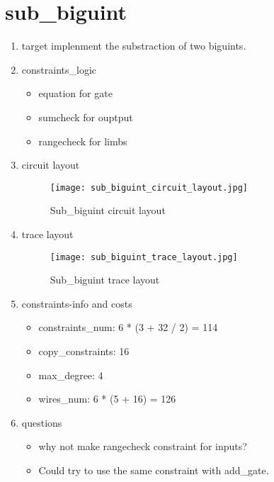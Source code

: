 \section{sub_biguint}
\label{sub_biguint}

\begin{enumerate}
    \item target
        implenment the substraction of two biguints.
    \item constraints_logic
        \begin{itemize}
            \item equation for gate
            \item sumcheck for ouptput 
            \item rangecheck for limbs
        \end{itemize}
    \item circuit layout
        \begin{figure}[!ht]
            \centering
            \texttt{[image: sub\_biguint\_circuit\_layout.jpg]}
            \caption{Sub_biguint circuit layout}
            \label{fig:sub_biguint_circuit_layout}
        \end{figure}

    \item trace layout
        \begin{figure}[!ht]
            \centering
            \texttt{[image: sub\_biguint\_trace\_layout.jpg]}
            \caption{Sub_biguint trace layout}
            \label{fig:sub_biguint_trace_layout}
        \end{figure}
    
    \item constraints-info and costs
        \begin{itemize}
            \item constraints_num: 6 * (3 + 32 / 2) = 114
            \item copy_constraints: 16
            \item max_degree: 4
            \item wires_num: 6 * (5 + 16) = 126
        \end{itemize}

    \item questions
        \begin{itemize}
            \item why not make rangecheck constraint for inputs?
            \item Could try to use the same constraint with add_gate.
        \end{itemize}

\end{enumerate}